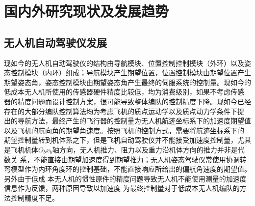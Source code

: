 \section{国内外研究现状及发展趋势}
\subsection{无人机自动驾驶仪发展}
现如今的无人机自动驾驶仪的结构由导航模块、位置控制控制模块（外环）以及姿态控制模块（内环）组成；导航模块产生期望位置，位置控制模块由期望位置产生
期望姿态角，姿态控制模块由期望姿态角产生最终的伺服系统的控制量。现如今的低成本无人机所使用的传感器硬件精度比较低，均为消费级别，如果不考虑传感
器的精度问题而设计控制方案，很可能导致整体编队的控制精度下降。现如今已经存在的大部分编队控制算法均为考虑飞机的质点运动学以及质点动力学条件下提
出的导航方法，最终产生的飞行器的控制量为无人机航迹坐标系下的加速度期望值以及飞机的航向角的期望角速度。按照飞机的控制方式，需要将航迹坐标系下的
期望控制量转到机体系之下，但是飞机自动驾驶仪并不能接受加速度控制量，尤其是飞机机体$O_bx_b$轴方向，无人机推力、阻力以及重力沿机体方向的推力并非是代数关
系，不能直接由期望加速度得到期望推力；无人机姿态驾驶仪常使用协调转弯模型作为内环角度环的控制基础，不能直接响应所给出的偏航角速度的期望值。另外由于低成
本无人机的惯性原件的精度问题导致无人机不能使用测量的加速度信息作为反馈，两种原因导致以加速度
为最终控制量对于低成本无人机编队的方法控制精度不足。
